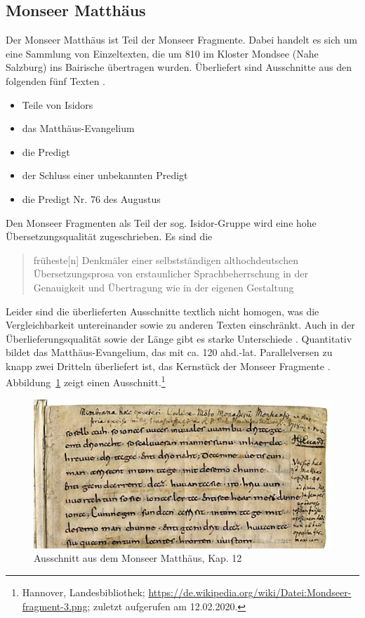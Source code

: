 \subsection{Monseer Matthäus} \label{sec:monsee}

Der Monseer Matthäus ist Teil der Monseer Fragmente. Dabei handelt es sich um eine Sammlung von Einzeltexten, die um 810 im Kloster Mondsee (Nahe Salzburg) ins Bairische übertragen wurden. Überliefert sind Ausschnitte aus den folgenden fünf Texten \parencite{Krotz2003}.


\begin{itemize}
\item Teile von Isidors  
\item das Matthäus-Evangelium
\item die Predigt 
\item der Schluss einer unbekannten Predigt
\item die Predigt Nr. 76 des Augustus
\end{itemize}

Den Monseer Fragmenten als Teil der sog. Isidor-Gruppe wird eine hohe Übersetzungsqualität zugeschrieben. Es sind die \blockcquote[129]{Sonderegger2003}{früheste[n] Denkmäler einer selbstständigen althochdeutschen Übersetzungsprosa von erstaunlicher Sprachbeherrschung in der Genauigkeit und Übertragung wie in der eigenen Gestaltung}. 
Leider sind die überlieferten Ausschnitte textlich nicht homogen, was die Vergleichbarkeit untereinander sowie zu anderen Texten einschränkt. Auch in der Überlieferungsqualität sowie der Länge gibt es starke Unterschiede \parencite[s. ausführlich][]{Krotz2002,Krotz2003}. Quantitativ bildet das Matthäus-Evangelium, das mit ca. 120 ahd.-lat. Parallelversen zu knapp zwei Dritteln überliefert ist, das Kernstück der Monseer Fragmente 
\parencites()()[82]{Matzel1970}[26--27]{Schlachter2012}.
Abbildung~\ref{abb:MF-handschrift} zeigt einen Ausschnitt.\footnote{Hannover, Landesbibliothek; \url{https://de.wikipedia.org/wiki/Datei:Mondseer-fragment-3.png}; zuletzt aufgerufen am 12.02.2020.} 

\begin{figure}[h]
\begin{center}
  \includegraphics[width=10 cm]{images/MF-handschrift-ausschnitt.jpg}
\caption {Ausschnitt aus dem Monseer Matthäus, Kap. 12}
\label{abb:MF-handschrift}
\end{center}
\end{figure} 

